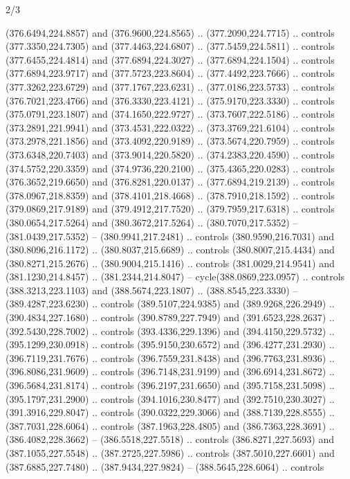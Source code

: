 \begin{flagdescription}{2/3}
\begin{scope}[xshift=0.5\flaglength,yshift=0.5\flagwidth,scale=\flagwidth/495.65]
\begin{scope}[y=0.8pt, x=0.8pt, yscale=-1,shift={(-463.76,-309.78)}]
  (376.6494,224.8857) and (376.9600,224.8565) .. (377.2090,224.7715) .. controls
  (377.3350,224.7305) and (377.4463,224.6807) .. (377.5459,224.5811) .. controls
  (377.6455,224.4814) and (377.6894,224.3027) .. (377.6894,224.1504) .. controls
  (377.6894,223.9717) and (377.5723,223.8604) .. (377.4492,223.7666) .. controls
  (377.3262,223.6729) and (377.1767,223.6231) .. (377.0186,223.5733) .. controls
  (376.7021,223.4766) and (376.3330,223.4121) .. (375.9170,223.3330) .. controls
  (375.0791,223.1807) and (374.1650,222.9727) .. (373.7607,222.5186) .. controls
  (373.2891,221.9941) and (373.4531,222.0322) .. (373.3769,221.6104) .. controls
  (373.2978,221.1856) and (373.4092,220.9189) .. (373.5674,220.7959) .. controls
  (373.6348,220.7403) and (373.9014,220.5820) .. (374.2383,220.4590) .. controls
  (374.5752,220.3359) and (374.9736,220.2100) .. (375.4365,220.0283) .. controls
  (376.3652,219.6650) and (376.8281,220.0137) .. (377.6894,219.2139) .. controls
  (378.0967,218.8359) and (378.4101,218.4668) .. (378.7910,218.1592) .. controls
  (379.0869,217.9189) and (379.4912,217.7520) .. (379.7959,217.6318) .. controls
  (380.0654,217.5264) and (380.3672,217.5264) .. (380.7070,217.5352) --
  (381.0439,217.5352) -- (380.9941,217.2481) .. controls (380.9590,216.7031) and
  (380.8096,216.1172) .. (380.8037,215.6689) .. controls (380.8007,215.4434) and
  (380.8271,215.2676) .. (380.9004,215.1416) .. controls (381.0029,214.9541) and
  (381.1230,214.8457) .. (381.2344,214.8047) -- cycle(388.0869,223.0957) ..
  controls (388.3213,223.1103) and (388.5674,223.1807) .. (388.8545,223.3330) --
  (389.4287,223.6230) .. controls (389.5107,224.9385) and (389.9268,226.2949) ..
  (390.4834,227.1680) .. controls (390.8789,227.7949) and (391.6523,228.2637) ..
  (392.5430,228.7002) .. controls (393.4336,229.1396) and (394.4150,229.5732) ..
  (395.1299,230.0918) .. controls (395.9150,230.6572) and (396.4277,231.2930) ..
  (396.7119,231.7676) .. controls (396.7559,231.8438) and (396.7763,231.8936) ..
  (396.8086,231.9609) .. controls (396.7148,231.9199) and (396.6914,231.8672) ..
  (396.5684,231.8174) .. controls (396.2197,231.6650) and (395.7158,231.5098) ..
  (395.1797,231.2900) .. controls (394.1016,230.8477) and (392.7510,230.3027) ..
  (391.3916,229.8047) .. controls (390.0322,229.3066) and (388.7139,228.8555) ..
  (387.7031,228.6064) .. controls (387.1963,228.4805) and (386.7363,228.3691) ..
  (386.4082,228.3662) -- (386.5518,227.5518) .. controls (386.8271,227.5693) and
  (387.1055,227.5548) .. (387.2725,227.5986) .. controls (387.5010,227.6601) and
  (387.6885,227.7480) .. (387.9434,227.9824) -- (388.5645,228.6064) .. controls

\end{scope}
\end{scope}
\end{flagdescription}
